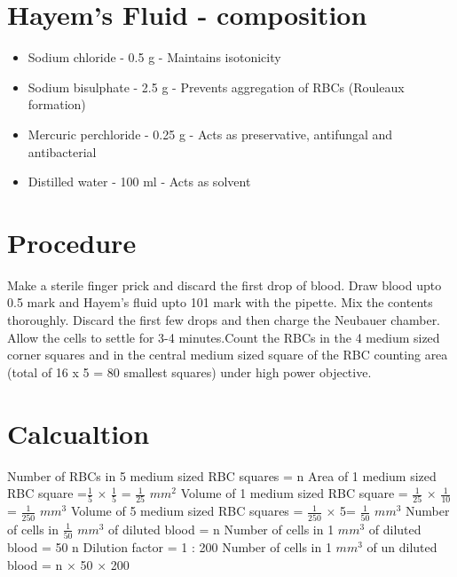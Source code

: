 \documentclass[a4paper,12pt]{book}
\begin{document}
		\section*{Hayem's Fluid - composition}
		\begin{itemize}

\item{		Sodium chloride - 0.5 g	- Maintains isotonicity}
\item{		Sodium bisulphate - 2.5 g - Prevents aggregation  of RBCs (Rouleaux formation)}
\item{		Mercuric perchloride - 0.25 g - Acts  as preservative, antifungal and antibacterial}
\item{		Distilled water - 100 ml - Acts as solvent}
		\end{itemize}


		\section*{Procedure}
		
Make  a  sterile  finger  prick  and  discard  the  first drop  of blood. Draw blood upto  0.5  mark  and  Hayem’s  fluid  upto 101  mark  with  the  pipette. Mix  the contents thoroughly. Discard  the  first  few  drops and then charge  the  Neubauer chamber. Allow  the cells to  settle  for  3-4  minutes.Count the RBCs in the 4 medium sized corner squares and  in the central medium sized square of the RBC counting area (total of 16 x 5 = 80 smallest squares) under high power objective.


\section*{Calcualtion}
Number of RBCs in 5 medium sized RBC squares = n\newline\vspace{.4cm}
Area of 1 medium  sized RBC square =$\frac{1}{5}$ $\times$ $\frac{1}{5}$ = $\frac{1}{25}$ $mm^2$\newline\vspace{.4cm}
Volume of 1 medium sized RBC square = $\frac{1}{25}$ $\times$ $\frac{1}{10}$ = $\frac{1}{250}$ $mm^3$\newline\vspace{.4cm}
Volume of 5 medium sized RBC squares = $\frac{1}{250}$ $\times$ 5= $\frac{1}{50}$ $mm^3$\newline\vspace{.4cm}
Number of cells in  $\frac{1}{50}$ $mm^3$ of diluted blood  = n\newline\vspace{.4cm}
Number of cells in  1 $mm^3$  of diluted blood = 50 n\newline\vspace{.4cm}
Dilution factor = 1 : 200\newline\vspace{.4cm}
Number of cells in 1 $mm^3$ of un diluted blood 	= n $\times$ 50 $\times$ 200  \newline\vspace{.4cm}
\end{document}
